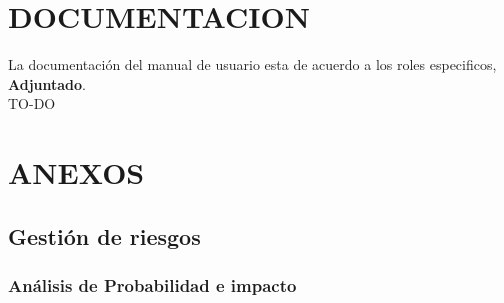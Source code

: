 \documentclass[11pt,letterpaper]{report}
\begin{document}
\chapter{DOCUMENTACION}
La documentación del manual de usuario esta de acuerdo a los roles especificos, \textbf{Adjuntado}.\\
TO-DO
\chapter{ANEXOS}
\section{Gestión de riesgos}
\subsection{Análisis de Probabilidad e impacto}
\end{document}
